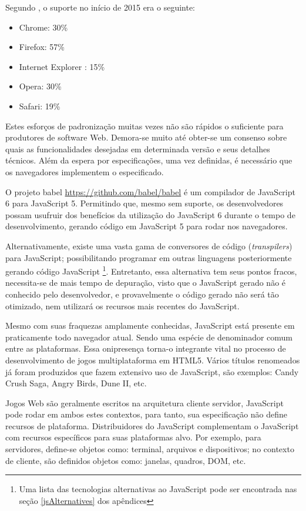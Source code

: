 Segundo \citet{ecmaSupport}, o suporte no início de 2015 era o seguinte:

\begin{itemize}
    \item Chrome: 30\%
    \item Firefox: 57\%
    \item Internet Explorer : 15\%
    \item Opera: 30\%
    \item Safari: 19\%
\end{itemize}

Estes esforços de padronização muitas vezes não são rápidos
o suficiente para produtores de software Web. Demora-se muito até
obter-se um consenso sobre quais as funcionalidades desejadas em
determinada versão e seus detalhes técnicos. Além da
espera por especificações, uma vez definidas, é necessário que os
navegadores implementem o especificado.

O projeto babel \url{https://github.com/babel/babel} é um compilador de
JavaScript 6 para JavaScript 5. Permitindo que, mesmo sem suporte, os
desenvolvedores possam usufruir dos benefícios da utilização do
JavaScript 6 durante o tempo de desenvolvimento, gerando código em
JavaScript 5 para rodar nos navegadores.

Alternativamente, existe uma vasta gama de conversores de código
(\textit{transpilers}) para JavaScript; possibilitando programar
em outras linguagens posteriormente gerando código JavaScript
\footnote{Uma lista das tecnologias alternativas ao JavaScript pode ser
encontrada nas seção \ref{jsAlternatives} dos apêndices}. Entretanto,
essa alternativa tem seus pontos fracos, necessita-se de mais tempo
de depuração, visto que o JavaScript gerado não é conhecido pelo
desenvolvedor, e provavelmente o código gerado não será tão
otimizado, nem utilizará os recursos mais recentes do JavaScript.

Mesmo com suas fraquezas amplamente conhecidas, JavaScript está
presente em praticamente todo navegador atual. Sendo uma espécie de
denominador comum entre as plataformas. Essa onipresença torna-o
integrante vital no processo de desenvolvimento de jogos multiplataforma
em HTML5. Vários títulos renomeados já foram produzidos que fazem
extensivo uso de JavaScript, são exemplos: Candy Crush Saga, Angry
Birds, Dune II, etc.

Jogos Web são geralmente escritos na arquitetura cliente servidor,
JavaScript pode rodar em ambos estes contextos, para tanto, sua
especificação não define recursos de plataforma. Distribuidores do
JavaScript complementam o JavaScript com recursos específicos para
suas plataformas alvo. Por exemplo, para servidores, define-se objetos como:
terminal, arquivos e dispositivos; no contexto de cliente,
são definidos objetos como: janelas, quadros, DOM, etc.

